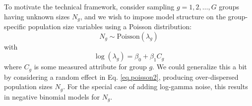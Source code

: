 To motivate the technical framework, consider sampling $g=1,2,\ldots,G$
groups having unknown sizes $N_{g}$, and we wish to impose model
structure on the group-specific population size variables using a
Poisson distribution:
\begin{equation}
 N_{g} \sim \mbox{Poisson}(\lambda_{g})
\label{eq.poisson1}
\end{equation}
with
\begin{equation}
\log( \lambda_{g} ) = \beta_{0} + \beta_{1} C_{g}
\label{eq.poisson2}
\end{equation}
where $C_{g}$ is some measured attribute for group $g$.  We could
generalize this a bit by considering a random effect in
Eq. \ref{eq.poisson2}, producing over-dispersed population sizes
$N_{g}$. For the special case of adding log-gamma noise, this results
in negative binomial models for $N_{g}$.

